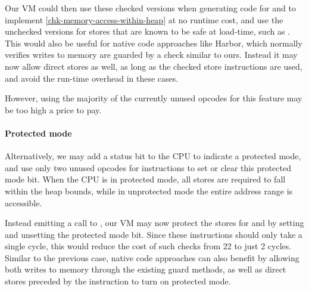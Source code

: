 Our VM could then use these checked versions when generating code for  and  to implement \ref{chk-memory-access-within-heap} at no runtime cost, and use the unchecked versions for stores that are known to be safe at load-time, such as . This would also be useful for native code approaches like Harbor, which normally verifies writes to memory are guarded by a check similar to ours. Instead it may now allow direct stores as well, as long as the checked store instructions are used, and avoid the run-time overhead in these cases.

However, using the majority of the currently unused opcodes for this feature may be too high a price to pay.

\paragraph{Protected mode}
Alternatively, we may add a status bit to the CPU to indicate a protected mode, and use only two unused opcodes for instructions to set or clear this protected mode bit. When the CPU is in protected mode, all stores are required to fall within the heap bounds, while in unprotected mode the entire address range is accessible.

Instead emitting a call to , our VM may now protect the stores for  and  by setting and unsetting the protected mode bit. Since these instructions should only take a single cycle, this would reduce the cost of such checks from 22 to just 2 cycles. Similar to the previous case, native code approaches can also benefit by allowing both writes to memory through the existing guard methods, as well as direct stores preceded by the instruction to turn on protected mode.
